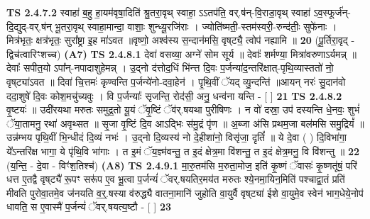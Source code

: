 \documentclass[17pt]{extarticle}
\begin{document}
                  \newline
                                \textbf{ TS 2.4.7.2} \newline
                  स्वाहा॑ ब॒हु हा॒यम॑वृषा॒दिति॑ श्रु॒तरा॒वृथ् स्वाहा॒ ऽऽतप॑ति॒ वर्.ष॑न्-वि॒राडा॒वृथ् स्वाहा॑ ऽव॒स्फूर्ज॑न्-दि॒द्युद्-वर्.ष॑न् भू॒तरा॒वृथ् स्वाहा॒मान्दा॒ वाशाः॒ शुन्ध्यू॒रजि॑राः । ज्योति॑ष्मती॒-स्तम॑स्वरी॒-रुन्द॑तीः॒ सुफे॑नाः । मित्र॑भृतः॒ क्षत्र॑भृतः॒ सुरा᳚ष्ट्रा इ॒ह मा॑ऽवत ॥वृष्णो॒ अश्व॑स्य स॒न्दान॑मसि॒ वृष्‌ट्यै॒ त्वोप॑ नह्यामि ॥ \textbf{  20} \newline
                  \newline
                      (पू॒र्तिरा॒वृद् - द्विच॑त्वारिꣳशच्च)  \textbf{(A7)} \newline \newline
                                        \textbf{ TS 2.4.8.1} \newline
                  देवा॑ वसव्या॒ अग्ने॑ सोम सूर्य ॥ देवाः᳚ शर्मण्या॒ मित्रा॑वरुणाऽर्यमन्न् ॥ देवाः᳚ सपीत॒यो ऽपा᳚न्-नपादाशुहेमन्न् । उ॒द्नो द॑त्तोद॒धिं भि॑न्त्त दि॒वः प॒र्जन्या॑द॒न्तरि॑क्षात्-पृथि॒व्यास्ततो॑ नो॒ वृष्‌ट्या॑ऽवत ॥ दिवा॑ चि॒त्तमः॑ कृण्वन्ति प॒र्जन्ये॑नो-दवा॒हेन॑ । पृ॒थि॒वीं ॅयद् व्यु॒न्दन्ति॑ ॥आयन् नरः॑ सु॒दान॑वो ददा॒शुषे॑ दि॒वः कोश॒मचु॑च्यवुः । वि प॒र्जन्याः᳚ सृजन्ति॒ रोद॑सी॒ अनु॒ धन्व॑ना यन्ति - [  ] \textbf{  21} \newline
                  \newline
                                \textbf{ TS 2.4.8.2} \newline
                  वृ॒ष्टयः॑ ॥ उदी॑रयथा मरुतः समुद्र॒तो यू॒यं ॅवृ॒ष्टिं ॅव॑र्.षयथा पुरीषिणः । न वो॑ दस्रा॒ उप॑ दस्यन्ति धे॒नवः॒ शुभं॑ ॅया॒तामनु॒ रथा॑ अवृथ्सत ॥ सृ॒जा वृ॒ष्टिं दि॒व आऽद्भिः स॑मु॒द्रं पृ॑ण ॥ अ॒ब्जा अ॑सि प्रथम॒जा बल॑मसि समु॒द्रियं᳚ ॥ उन्न॑म्भय पृथि॒वीं भि॒न्धीदं दि॒व्यं नभः॑ । उ॒द्नो दि॒व्यस्य॑ नो दे॒हीशा॑नो॒ विसृ॑जा॒ दृतिं᳚ ॥ ये दे॒वा ( ) दि॒विभा॑गा॒ ये᳚ऽन्तरि॑क्ष भागा॒ ये पृ॑थि॒वि भा॑गाः । त इ॒मं ॅय॒ज्ञ्म॑वन्तु॒ त इ॒दं क्षेत्र॒मा वि॑शन्तु॒ त इ॒दं क्षेत्र॒मनु॒ वि वि॑शन्तु ॥ \textbf{  22} \newline
                  \newline
                      (य॒न्ति॒ - दे॒वा - विꣳ॑श॒तिश्च॑)  \textbf{(A8)} \newline \newline
                                        \textbf{ TS 2.4.9.1} \newline
                  मा॒रु॒तम॑सि म॒रुता॒मोज॒ इति॑ कृ॒ष्णं ॅवासः॑ कृ॒ष्णतू॑षं॒ परि॑ धत्त ए॒तद्वै वृष्‌ट्यै॑ रू॒पꣳ सरू॑प ए॒व भू॒त्वा प॒र्जन्यं॑ ॅवर्.षयतिर॒मय॑त मरुतः श्ये॒नमा॒यिन॒मिति॑ पश्चाद्वा॒तं प्रति॑ मीवति पुरोवा॒तमे॒व ज॑नयति व॒र्॒.षस्या व॑रुद्ध्यै वातना॒मानि॑ जुहोति वा॒युर्वै वृष्‌ट्या॑ ईशे वा॒युमे॒व स्वेन॑ भाग॒धेये॒नोप॑ धावति॒ स ए॒वास्मै॑ प॒र्जन्यं॑ ॅवर्.षयत्य॒ष्टौ - [  ] \textbf{  23} \newline
\end{document}
